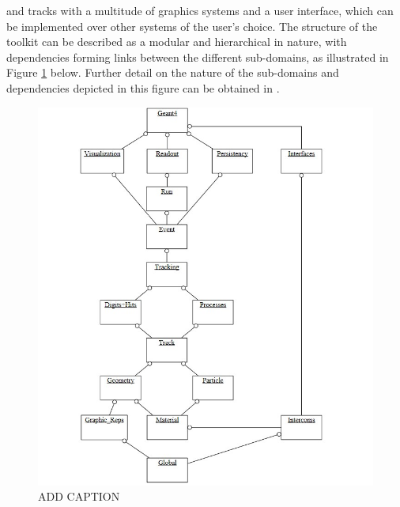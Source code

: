 and tracks with a multitude of graphics systems and a user interface, which can be implemented over other systems of the user's choice. The structure of the toolkit can be described as a modular and hierarchical in nature, with dependencies forming links between the different sub-domains,
as illustrated in Figure \ref{Geant4Structure} below. Further detail on the nature of the sub-domains and dependencies depicted in this figure can be obtained in \cite{GEANT4:2002zbu}.
\begin{figure}[H]
    \centering
    \includegraphics[scale=0.7]{Geant4Structure.jpg}
    \caption{ADD CAPTION}
    \label{Geant4Structure}
\end{figure}
